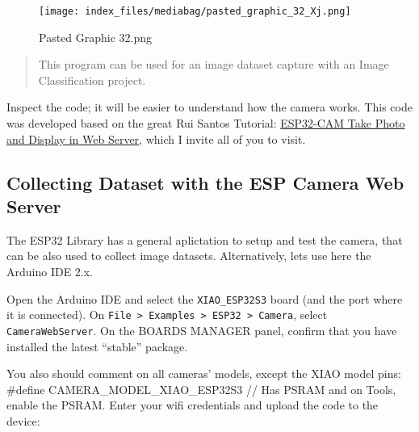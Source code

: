 \documentclass[
  letterpaper,
  DIV=11,
  numbers=noendperiod]{scrreprt}
\begin{document}
\begin{figure}[H]

{\centering \texttt{[image: index\_files/mediabag/pasted\_graphic\_32\_Xj.png]}

}

\caption{Pasted Graphic 32.png}

\end{figure}

\begin{quote}
This program can be used for an image dataset capture with an Image
Classification project.
\end{quote}

Inspect the code; it will be easier to understand how the camera works.
This code was developed based on the great Rui Santos Tutorial:
\href{https://randomnerdtutorials.com/esp32-cam-take-photo-display-web-server/}{ESP32-CAM
Take Photo and Display in Web Server}, which I invite all of you to
visit.

\hypertarget{collecting-dataset-with-the-esp-camera-web-server}{%
\subsection*{Collecting Dataset with the ESP Camera Web
Server}\label{collecting-dataset-with-the-esp-camera-web-server}}

The ESP32 Library has a general aplictation to setup and test the
camera, that can be also used to collect image datasets. Alternatively,
lets use here the Arduino IDE 2.x.

Open the Arduino IDE and select the \texttt{XIAO\_ESP32S3} board (and
the port where it is connected). On
\texttt{File\ \textgreater{}\ Examples\ \textgreater{}\ ESP32\ \textgreater{}\ Camera},
select \texttt{CameraWebServer}. On the BOARDS MANAGER panel, confirm
that you have installed the latest ``stable'' package.

You also should comment on all cameras' models, except the XIAO model
pins: \#define CAMERA\_MODEL\_XIAO\_ESP32S3 // Has PSRAM and on Tools,
enable the PSRAM. Enter your wifi credentials and upload the code to the
device:
\end{document}
